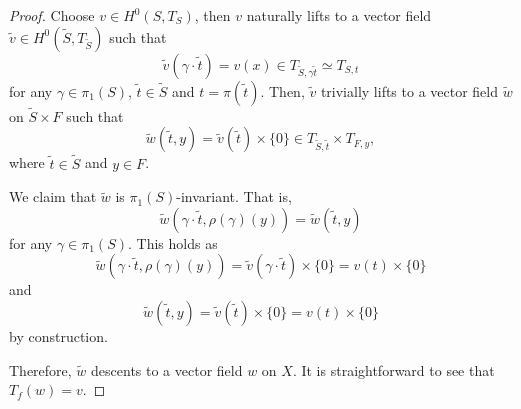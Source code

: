 \documentclass[10pt,a4paper]{amsart}
\newcommand{\ti}{\tilde}
\begin{document}
\begin{proof}
    Choose $v \in H^0(S, T_S)$, then $v$ naturally lifts to a vector field $\ti v \in H^0(\ti S, T_{\ti S})$ such that
    \[
    \ti v(\gamma \cdot \ti t) = v(x) \in T_{\ti S, \gamma\ti t} \simeq T_{S, t}
    \] for any $\gamma\in \pi_1(S)$, $\ti t \in \ti S$ and $t = \pi(\ti t)$. Then, $\ti v$ trivially lifts to a vector field $\ti w$ on $\ti S \times F$ such that
    \[
    \ti w(\ti t, y)= \ti v(\ti t) \times \{0\} \in T_{\ti S, \ti t} \times T_{F,y},
    \] where $\ti t\in\ti S$ and $y\in F$.

    We claim that $\ti w$ is $\pi_1(S)$-invariant. That is,
    \[
    \ti w(\gamma \cdot \ti t, \rho(\gamma)(y)) = \ti w(\ti t, y)
    \] for any $\gamma\in \pi_1(S)$. This holds as 
    \[
    \ti w(\gamma\cdot \ti t, \rho(\gamma)(y)) = \ti v(\gamma\cdot \ti t) \times \{0\}= v(t) \times \{0\}
    \] and
    \[
    \ti w(\ti t, y) = \ti v(\ti t) \times \{0\}= v(t) \times \{0\}
    \] by construction.

    Therefore, $\ti w$ descents to a vector field $w$ on $X$. It is straightforward to see that $T_f(w)=v$.
\end{proof}
\end{document}
